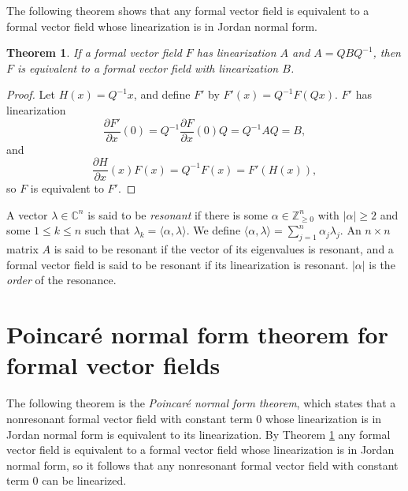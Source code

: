 \documentclass{article}
\newtheorem{theorem}{Theorem}
\begin{document}
The following theorem shows that any formal vector field is equivalent to a formal vector field whose linearization is in Jordan normal form.

\begin{theorem}
\label{jordanform}
If a formal vector field $F$ has linearization $A$ and $A=QBQ^{-1}$, then
$F$ is equivalent to a formal vector field with linearization $B$.
\end{theorem}
\begin{proof}
Let $H(x)=Q^{-1}x$, and
define $F'$ by $F'(x)=Q^{-1} F(Qx)$. $F'$ has linearization
\[
\frac{\partial F'}{\partial x}(0)=Q^{-1}\frac{\partial F}{\partial x}(0) Q=Q^{-1}AQ=B,
\]
and
\[
\frac{\partial H}{\partial x}(x)F(x)=Q^{-1}F(x)=F'(H(x)),
\]
so $F$ is equivalent to $F'$.
\end{proof}

A vector $\lambda \in \mathbb{C}^n$ is said to be {\em resonant} if there is some $\alpha \in \mathbb{Z}^n_{\geq 0}$ with
$|\alpha| \geq 2$ and some $1 \leq k \leq n$ such that $\lambda_k = \langle \alpha, \lambda \rangle$.
We define $\langle \alpha,\lambda \rangle=\sum_{j=1}^n \alpha_j \lambda_j$.
An $n \times n$ matrix $A$ is said to be resonant if the vector of its eigenvalues 
is resonant, and a formal vector field is said to be resonant if its linearization is resonant. $|\alpha|$ is the {\em order} of the resonance.

\section{Poincar\'e normal form theorem for formal vector fields}
The following theorem is the {\em Poincar\'e normal form theorem}, which states that a nonresonant formal vector field with constant term $0$ whose linearization is in Jordan normal form is equivalent to its linearization. By Theorem \ref{jordanform} any formal vector field is equivalent to a formal vector field whose linearization is in Jordan normal form,
so it follows that any nonresonant formal vector field with constant term $0$ can be linearized.
\end{document}
